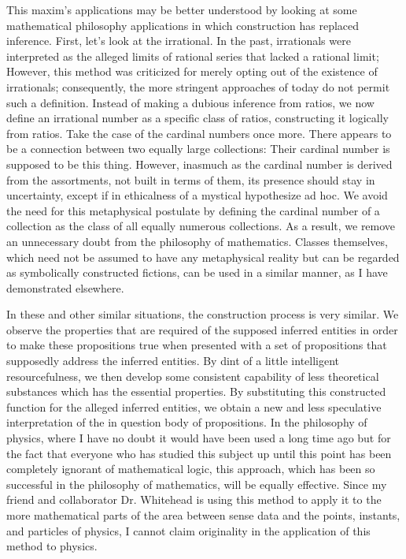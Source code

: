 \documentclass[a4paper,12pt]{book}[2004/02/16]
\theoremstyle{ilemma}
\theoremstyle{itheorem}
\theoremstyle{iother}
\theoremstyle{icorollary}
\theoremstyle{numcorollary}
\theoremstyle{idefinition}
\begin{document}
This maxim's applications may be better understood by looking at some mathematical philosophy applications in which construction has replaced inference. First, let's look at the irrational. In the past, irrationals were interpreted as the alleged limits of rational series that lacked a rational limit; However, this method was criticized for merely opting out of the existence of irrationals; consequently, the more stringent approaches of today do not permit such a definition. Instead of making a dubious inference from ratios, we now define an irrational number as a specific class of ratios, constructing it logically from ratios. Take the case of the cardinal numbers once more. There appears to be a connection between two equally large collections: Their cardinal number is supposed to be this thing. However, inasmuch as the
cardinal number is derived from the assortments, not built in
terms of them, its presence should stay in uncertainty, except if in ethicalness of
a mystical hypothesize ad hoc. We avoid the need for this metaphysical postulate by defining the cardinal number of a collection as the class of all equally numerous collections. As a result, we remove an unnecessary doubt from the philosophy of mathematics.
Classes themselves, which need not be assumed to have any metaphysical reality but can be regarded as symbolically constructed fictions, can be used in a similar manner, as I have demonstrated elsewhere.

In these and other similar situations, the construction process is very similar. We observe the properties that are required of the supposed inferred entities in order to make these propositions true when presented with a set of propositions that supposedly address the inferred entities. By dint of a little intelligent resourcefulness, we then
develop some consistent capability of less theoretical substances which
has the essential properties. By substituting this constructed function for the alleged inferred entities, we obtain a new and less speculative interpretation of the in question body of propositions. In the philosophy of physics, where I have no doubt it would have been used a long time ago but for the fact that everyone who has studied this subject up until this point has been completely ignorant of mathematical logic, this approach, which has been so successful in the philosophy of mathematics, will be equally effective. Since my friend and collaborator Dr. Whitehead is using this method to apply it to the more mathematical parts of the area between sense data and the points, instants, and particles of physics, I cannot claim originality in the application of this method to physics.
\end{document}
